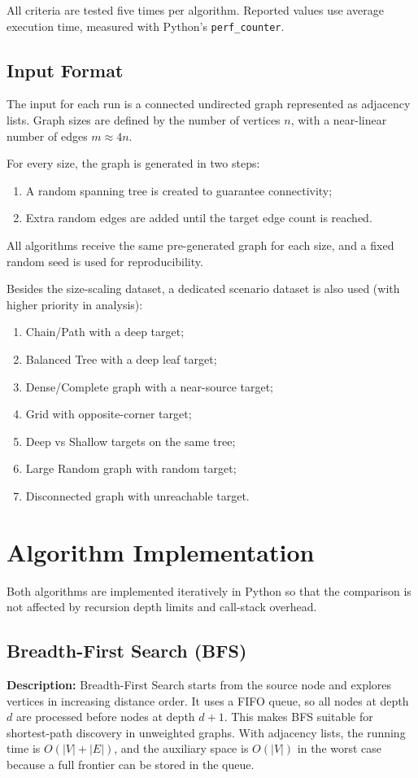 \documentclass{labreport}
\begin{document}
All criteria are tested five times per algorithm. Reported values use average execution time, measured with Python's \texttt{perf\_counter}.

\subsection{Input Format}
The input for each run is a connected undirected graph represented as adjacency lists. Graph sizes are defined by the number of vertices $n$, with a near-linear number of edges $m \approx 4n$.

For every size, the graph is generated in two steps:
\begin{enumerate}
    \item A random spanning tree is created to guarantee connectivity;
    \item Extra random edges are added until the target edge count is reached.
\end{enumerate}

All algorithms receive the same pre-generated graph for each size, and a fixed random seed is used for reproducibility.

Besides the size-scaling dataset, a dedicated scenario dataset is also used (with higher priority in analysis):
\begin{enumerate}
    \item Chain/Path with a deep target;
    \item Balanced Tree with a deep leaf target;
    \item Dense/Complete graph with a near-source target;
    \item Grid with opposite-corner target;
    \item Deep vs Shallow targets on the same tree;
    \item Large Random graph with random target;
    \item Disconnected graph with unreachable target.
\end{enumerate}

\newpage
\section{Algorithm Implementation}
Both algorithms are implemented iteratively in Python so that the comparison is not affected by recursion depth limits and call-stack overhead.

\subsection{Breadth-First Search (BFS)}
\textbf{Description:} Breadth-First Search starts from the source node and explores vertices in increasing distance order. It uses a FIFO queue, so all nodes at depth $d$ are processed before nodes at depth $d+1$. This makes BFS suitable for shortest-path discovery in unweighted graphs. With adjacency lists, the running time is $O(|V|+|E|)$, and the auxiliary space is $O(|V|)$ in the worst case because a full frontier can be stored in the queue.
\end{document}
